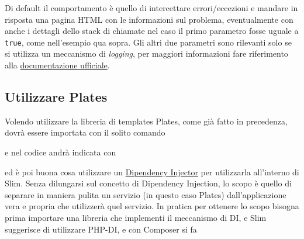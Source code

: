 Di default il comportamento è quello di intercettare errori/eccezioni e
mandare in risposta una pagina HTML con le informazioni sul problema,
eventualmente con anche i dettagli dello stack di chiamate nel caso il
primo parametro fosse uguale a \texttt{true}, come nell'esempio qua
sopra. Gli altri due parametri sono rilevanti solo se si utilizza un
meccanismo di \emph{logging}, per maggiori informazioni fare riferimento
alla
\href{https://www.slimframework.com/docs/v4/middleware/error-handling.html}{documentazione
ufficiale}.

\hypertarget{utilizzare-plates}{%
\subsection{Utilizzare Plates}\label{utilizzare-plates}}

Volendo utilizzare la libreria di templates Plates, come già fatto in
precedenza, dovrà essere importata con il solito comando

\begin{Shaded}
\begin{Highlighting}[]
\end{Highlighting}
\end{Shaded}

e nel codice andrà indicata con

\begin{Shaded}
\begin{Highlighting}[]
 \OtherTok{;}
\end{Highlighting}
\end{Shaded}

ed è poi buona cosa utilizzare un
\href{https://en.wikipedia.org/wiki/Dependency_injection}{Dipendency
Injector} per utilizzarla all'interno di Slim. Senza dilungarsi sul
concetto di Dipendency Injection, lo scopo è quello di separare in
maniera pulita un servizio (in questo caso Plates) dall'applicazione
vera e propria che utilizzerà quel servizio. In pratica per ottenere lo
scopo bisogna prima importare una libreria che implementi il meccanismo
di DI, e Slim suggerisce di utilizzare PHP-DI, e con Composer si fa

\begin{Shaded}
\begin{Highlighting}[]
\PreprocessorTok{*} 
\end{Highlighting}
\end{Shaded}

